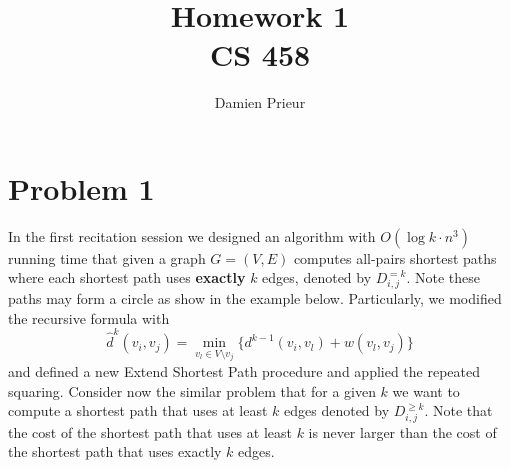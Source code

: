 \documentclass{article}
\author{Damien Prieur}
\title{Homework 1 \\ CS 458}
\date{}
\begin{document}
\maketitle

\section*{Problem 1}
In the first recitation session we designed an algorithm with $O(\log k \cdot n^3)$ running time that given a graph $G=(V,E)$ computes all-pairs shortest paths where each shortest path uses \textbf{exactly} $k$ edges, denoted by $D^{=k}_{i,j}$.
Note these paths may form a circle as show in the example below.
Particularly, we modified the recursive formula with
$$\hat{d}^k (v_i,v_j) = \min_{v_l \in V\setminus v_j} \{d^{k-1}(v_i,v_l) + w(v_l,v_j)\}$$
and defined a new Extend Shortest Path procedure and applied the repeated squaring.
Consider now the similar problem that for a given $k$ we want to compute a shortest path that uses at least $k$ edges denoted by $D^{\geq k}_{i,j}$.
Note that the cost of the shortest path that uses at least $k$ is never larger than the cost of the shortest path that uses exactly $k$ edges.
\end{document}
